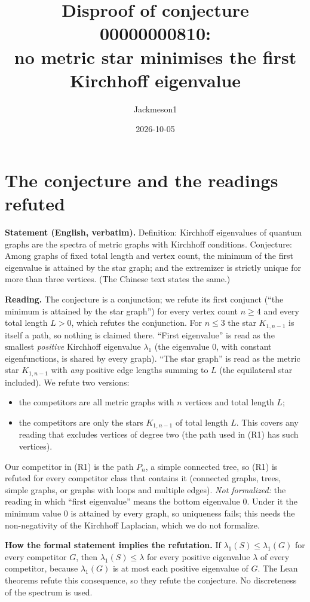 \documentclass[11pt]{article}
\title{Disproof of conjecture 00000000810:\\ no metric star minimises the first Kirchhoff eigenvalue}
\author{Jackmeson1}
\date{2026-10-05}
\theoremstyle{definition}
\theoremstyle{remark}
\begin{document}
\maketitle

\section{The conjecture and the readings refuted}

\textbf{Statement (English, verbatim).} Definition: Kirchhoff eigenvalues of quantum graphs are the
spectra of metric graphs with Kirchhoff conditions. Conjecture: Among graphs of fixed total length and
vertex count, the minimum of the first eigenvalue is attained by the star graph; and the extremizer is
strictly unique for more than three vertices. (The Chinese text states the same.)

\textbf{Reading.} The conjecture is a conjunction; we refute its first conjunct (``the minimum is
attained by the star graph'') for every vertex count $n\ge 4$ and every total length $L>0$, which
refutes the conjunction. For $n\le 3$ the star $K_{1,n-1}$ is itself a path, so nothing is claimed
there. ``First eigenvalue'' is read as the smallest \emph{positive} Kirchhoff eigenvalue $\lambda_1$
(the eigenvalue $0$, with constant eigenfunctions, is shared by every graph). ``The star graph'' is
read as the metric star $K_{1,n-1}$ with \emph{any} positive edge lengths summing to $L$ (the
equilateral star included). We refute two versions:
\begin{itemize}
\item[(R1)] the competitors are all metric graphs with $n$ vertices and total length $L$;
\item[(R2)] the competitors are only the stars $K_{1,n-1}$ of total length $L$. This covers any
reading that excludes vertices of degree two (the path used in (R1) has such vertices).
\end{itemize}
Our competitor in (R1) is the path $P_n$, a simple connected tree, so (R1) is refuted for every
competitor class that contains it (connected graphs, trees, simple graphs, or graphs with loops and
multiple edges). \emph{Not formalized:} the reading in which ``first eigenvalue'' means the bottom
eigenvalue $0$. Under it the minimum value $0$ is attained by every graph, so uniqueness fails; this
needs the non-negativity of the Kirchhoff Laplacian, which we do not formalize.

\textbf{How the formal statement implies the refutation.} If $\lambda_1(S)\le\lambda_1(G)$ for every
competitor $G$, then $\lambda_1(S)\le\lambda$ for every positive eigenvalue $\lambda$ of every
competitor, because $\lambda_1(G)$ is at most each positive eigenvalue of $G$. The Lean theorems
refute this consequence, so they refute the conjecture. No discreteness of the spectrum is used.
\end{document}
